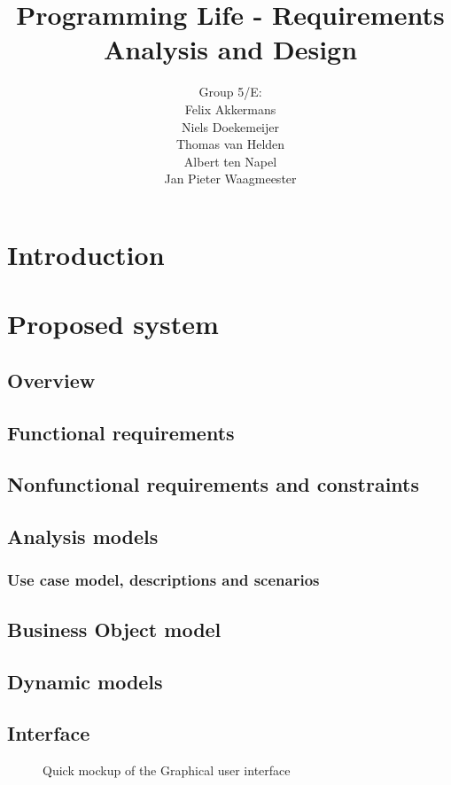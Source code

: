 \documentclass[a4paper]{article}
\title{Programming Life - Requirements Analysis and Design }
\author{Group 5/E:\\
Felix Akkermans \\
Niels Doekemeijer \\
Thomas van Helden \\
Albert ten Napel \\
Jan Pieter Waagmeester}
\begin{document}
\maketitle
\begin{center}

\end{center}

%
\vfill

\small{\tableofcontents}
\pagebreak
\section{Introduction} 		%
\section{Proposed system}
\subsection{Overview} 		%

\subsection{Functional requirements} %
\subsection{Nonfunctional requirements and constraints} %
\subsection{Analysis models}
\subsubsection{Use case model, descriptions and scenarios}
\subsection{Business Object model} %
\subsection{Dynamic models}
\subsection{Interface} %
\begin{figure}[h!]
\caption{Quick mockup of the Graphical user interface}
\end{figure}
\end{document}
